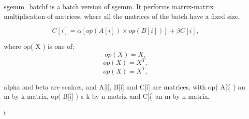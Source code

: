 sgemm\+\_\+batchf is a batch version of sgemm. It performs matrix-\/matrix multiplication of matrices, where all the matrices of the batch have a fixed size.

\[ C[i] = \alpha [op( A[i] )\times op( B[i] )] + \beta C[i], \]

where op( X ) is one of\+: \[ op( X ) = X, \] \[ op( X ) = X^T, \] \[ op( X ) = X^T, \]

alpha and beta are scalars, and A\mbox{[}i\mbox{]}, B\mbox{[}i\mbox{]} and C\mbox{[}i\mbox{]} are matrices, with op( A\mbox{[}i\mbox{]} ) an m-\/by-\/k matrix, op( B\mbox{[}i\mbox{]} ) a k-\/by-\/n matrix and C\mbox{[}i\mbox{]} an m-\/by-\/n matrix. \begin{DoxyVerb}                                                                        i
\end{DoxyVerb}
 
